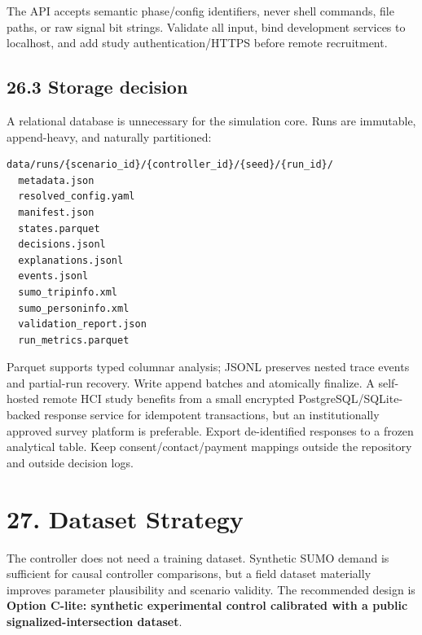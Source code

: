 \documentclass[
  english,
  11pt,
  a4paper,
]{article}
\begin{document}
The API accepts semantic phase/config identifiers, never shell commands,
file paths, or raw signal bit strings. Validate all input, bind
development services to localhost, and add study authentication/HTTPS
before remote recruitment.

\subsection{26.3 Storage decision}\label{storage-decision}

A relational database is unnecessary for the simulation core. Runs are
immutable, append-heavy, and naturally partitioned:

\begin{verbatim}
data/runs/{scenario_id}/{controller_id}/{seed}/{run_id}/
  metadata.json
  resolved_config.yaml
  manifest.json
  states.parquet
  decisions.jsonl
  explanations.jsonl
  events.jsonl
  sumo_tripinfo.xml
  sumo_personinfo.xml
  validation_report.json
  run_metrics.parquet
\end{verbatim}

Parquet supports typed columnar analysis; JSONL preserves nested trace
events and partial-run recovery. Write append batches and atomically
finalize. A self-hosted remote HCI study benefits from a small encrypted
PostgreSQL/SQLite-backed response service for idempotent transactions,
but an institutionally approved survey platform is preferable. Export
de-identified responses to a frozen analytical table. Keep
consent/contact/payment mappings outside the repository and outside
decision logs.

\section{27. Dataset Strategy}\label{dataset-strategy}

The controller does not need a training dataset. Synthetic SUMO demand
is sufficient for causal controller comparisons, but a field dataset
materially improves parameter plausibility and scenario validity. The
recommended design is \textbf{Option C-lite: synthetic experimental
control calibrated with a public signalized-intersection dataset}.
\end{document}

